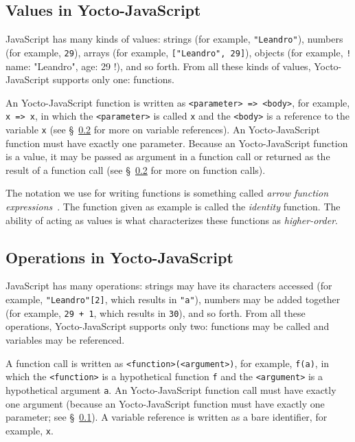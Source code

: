 \documentclass[12pt, oneside]{book}
\begin{document}
\subsection{Values in Yocto-JavaScript}
\label{Values in Yocto-JavaScript}

JavaScript has many kinds of values: strings (for example, \texttt{"Leandro"}), numbers (for example, \texttt{29}), arrays (for example, \texttt{["Leandro", 29]}), objects (for example, \texttt!{ name: "Leandro", age: 29 }!), and so forth. From all these kinds of values, Yocto-JavaScript supports only one: functions.

An Yocto-JavaScript function is written as \texttt{<parameter> => <body>}, for example, \texttt{x => x}, in which the \texttt{<parameter>} is called \texttt{x} and the \texttt{<body>} is a reference to the variable \texttt{x} (see §~\ref{Operations in Yocto-JavaScript} for more on variable references). An Yocto-JavaScript function must have exactly one parameter. Because an Yocto-JavaScript function is a value, it may be passed as argument in a function call or returned as the result of a function call (see §~\ref{Operations in Yocto-JavaScript} for more on function calls).

\begin{mdframed}[frametitle = {Technical Terms}]
The notation we use for writing functions is something called \emph{arrow function expressions}~\cite{javascript-arrow-function-expressions}. The function given as example is called the \emph{identity} function. The ability of acting as values is what characterizes these functions as \emph{higher-order}.
\end{mdframed}

\subsection{Operations in Yocto-JavaScript}
\label{Operations in Yocto-JavaScript}

JavaScript has many operations: strings may have its characters accessed (for example, \texttt{"Leandro"[2]}, which results in \texttt{"a"}), numbers may be added together (for example, \texttt{29 + 1}, which results in \texttt{30}), and so forth. From all these operations, Yocto-JavaScript supports only two: functions may be called and variables may be referenced.

A function call is written as \texttt{<function>(<argument>)}, for example, \texttt{f(a)}, in which the \texttt{<function>} is a hypothetical function \texttt{f} and the \texttt{<argument>} is a hypothetical argument \texttt{a}. An Yocto-JavaScript function call must have exactly one argument (because an Yocto-JavaScript function must have exactly one parameter; see §~\ref{Values in Yocto-JavaScript}). A variable reference is written as a bare identifier, for example, \texttt{x}.
\end{document}
